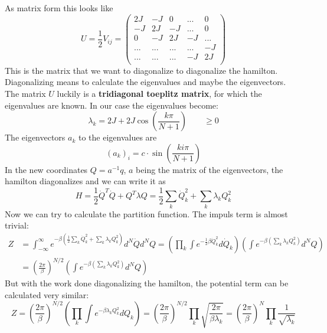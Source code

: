 	As matrix form this looks like
	\begin{equation}
		U = \frac{1}{2} V_{ij} =	\begin{pmatrix}
			2J & -J & 0 &... & 0\\
			-J & 2J & -J & ... & 0 \\
			0 & -J & 2J & -J & ... \\
			... & ... & ... & ... & -J \\
			... & ... & ... & -J & 2J \\
		\end{pmatrix}
	\end{equation}
	This is the matrix that we want to diagonalize to diagonalize the hamilton. Diagonalizing means to calculate the eigenvalues and maybe the eigenvectors. The matrix $U$ luckily is a \textbf{tridiagonal toeplitz matrix}, for which the eigenvalues are known. In our case the eigenvalues become:
	\begin{equation}
		\lambda_k =	2J + 2 J \cos \left(\frac{k \pi}{N + 1}\right) \qquad \geq 0
	\end{equation}
	The eigenvectors $a_k$ to the eigenvalues are
	\begin{equation}
		(a_k)_i =	c \cdot \sin \left(\frac{k i \pi}{N + 1}\right)
	\end{equation}
	In the new coordinates $Q =	a^{-1} q$, $a$ being the matrix of the eigenvectors, the hamilton diagonalizes and we can write it as
	\begin{equation}
		H =	\frac{1}{2} \dot{Q}^T \dot{Q} + Q^T \lambda Q =	\frac{1}{2} \sum_k \dot{Q}_k^2 + \sum_k \lambda_k Q_k^2
	\end{equation}
	Now we can try to calculate the partition function. The impuls term is almost trivial:
	\begin{align}
		Z &=	\int_{-\infty}^{\infty} e^{-\beta \left(\frac{1}{2} \sum_k \dot{Q}_k^2 + \sum_k \lambda_k Q_k^2\right)} d^N\dot{Q}d^NQ = \left(\prod_k \int e^{- \frac{1}{2} \beta  \dot{Q}_k^2 } d\dot{Q}_k\right)	\left( \int e^{-\beta \left(\sum_k \lambda_k Q_k^2\right)}d^NQ\right) \\
		&= \left(\frac{2 \pi}{\beta}\right)^{N/2} 	\left( \int e^{-\beta \left(\sum_k \lambda_k Q_k^2\right)}d^NQ\right)
	\end{align}
	But with the work done diagonalizing the hamilton, the potential term can be calculated very similar:
	\begin{equation}
		Z =	\left(\frac{2 \pi}{\beta}\right)^{N/2} \left(\prod_k \int e^{- \beta \lambda_k  {Q}_k^2 } d{Q}_k\right) =		\left(\frac{2 \pi}{\beta}\right)^{N/2} \prod_k \sqrt{\frac{2 \pi }{\beta \lambda_k}} =		\left(\frac{2 \pi}{\beta}\right)^{N} \prod_k \frac{1}{\sqrt{\lambda_k}}
	\end{equation}
